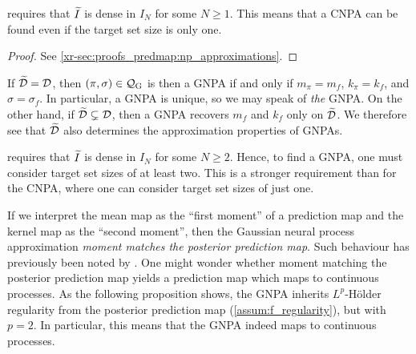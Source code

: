 \documentclass[12pt, twoside]{report}
\newcommand{\xrprefix}[1]{xr-#1}
\begin{document}
 requires that $\widetilde{I}$ is dense in $I_N$ for some $N \ge 1$.
This means that a CNPA can be found even if the target set size is only one.

\begin{proof}
    See \cref{\xrprefix{sec:proofs_predmap:np_approximations}}.
\end{proof}

If $\widetilde{\mathcal{D}} = \mathcal{D}$,
then $(\pi, \sigma) \in \Qc\ss{G}$ is then a GNPA if and only if $m_{\pi} = m_f$, $k_{\pi} = k_f$, and $\sigma = \sigma_f$.
In particular, a GNPA is unique, so we may speak of \emph{the} GNPA.
On the other hand, if $\widetilde{\mathcal{D}} \subsetneq \mathcal{D}$, then a GNPA recovers $m_f$ and $k_f$ only on $\widetilde{\mathcal{D}}$.
We therefore see that $\widetilde{\mathcal{D}}$ also determines the approximation properties of GNPAs.

 requires that $\widetilde{I}$ is dense in $I_N$ for some $N \ge 2$.
Hence, to find a GNPA, one must consider target set sizes of at least two.
This is a stronger requirement than for the CNPA, where one can consider target set sizes of just one.

If we interpret the mean map as the ``first moment'' of a prediction map and the kernel map as the ``second moment'', then the Gaussian neural process approximation \emph{moment matches the posterior prediction map}.
Such behaviour has previously been noted by \textcite{Ma:2018:Variational_Implicit_Processes}.
One might wonder whether moment matching the posterior prediction map yields a prediction map which maps to continuous processes.
As the following proposition shows, the GNPA inherits $L^p$-H\"older regularity from the posterior prediction map (\cref{assum:f_regularity}), but with $p = 2$.
In particular, this means that the GNPA indeed maps to continuous processes.
\end{document}
